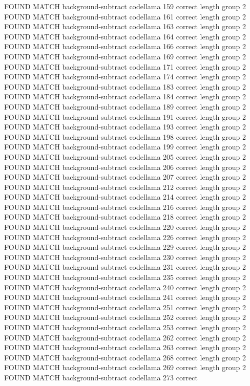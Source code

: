 FOUND MATCH background-subtract codellama 159 correct
length group  2
FOUND MATCH background-subtract codellama 161 correct
length group  2
FOUND MATCH background-subtract codellama 163 correct
length group  2
FOUND MATCH background-subtract codellama 164 correct
length group  2
FOUND MATCH background-subtract codellama 166 correct
length group  2
FOUND MATCH background-subtract codellama 169 correct
length group  2
FOUND MATCH background-subtract codellama 171 correct
length group  2
FOUND MATCH background-subtract codellama 174 correct
length group  2
FOUND MATCH background-subtract codellama 183 correct
length group  2
FOUND MATCH background-subtract codellama 184 correct
length group  2
FOUND MATCH background-subtract codellama 189 correct
length group  2
FOUND MATCH background-subtract codellama 191 correct
length group  2
FOUND MATCH background-subtract codellama 193 correct
length group  2
FOUND MATCH background-subtract codellama 198 correct
length group  2
FOUND MATCH background-subtract codellama 199 correct
length group  2
FOUND MATCH background-subtract codellama 205 correct
length group  2
FOUND MATCH background-subtract codellama 206 correct
length group  2
FOUND MATCH background-subtract codellama 207 correct
length group  2
FOUND MATCH background-subtract codellama 212 correct
length group  2
FOUND MATCH background-subtract codellama 214 correct
length group  2
FOUND MATCH background-subtract codellama 216 correct
length group  2
FOUND MATCH background-subtract codellama 218 correct
length group  2
FOUND MATCH background-subtract codellama 220 correct
length group  2
FOUND MATCH background-subtract codellama 226 correct
length group  2
FOUND MATCH background-subtract codellama 229 correct
length group  2
FOUND MATCH background-subtract codellama 230 correct
length group  2
FOUND MATCH background-subtract codellama 231 correct
length group  2
FOUND MATCH background-subtract codellama 235 correct
length group  2
FOUND MATCH background-subtract codellama 240 correct
length group  2
FOUND MATCH background-subtract codellama 241 correct
length group  2
FOUND MATCH background-subtract codellama 251 correct
length group  2
FOUND MATCH background-subtract codellama 252 correct
length group  2
FOUND MATCH background-subtract codellama 253 correct
length group  2
FOUND MATCH background-subtract codellama 262 correct
length group  2
FOUND MATCH background-subtract codellama 263 correct
length group  2
FOUND MATCH background-subtract codellama 268 correct
length group  2
FOUND MATCH background-subtract codellama 269 correct
length group  2
FOUND MATCH background-subtract codellama 273 correct
